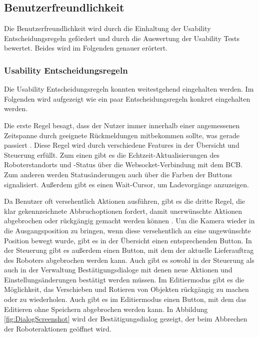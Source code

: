 \subsection{Benutzerfreundlichkeit}
Die Benutzerfreundlichkeit wird durch die Einhaltung der Usability Entscheidungsregeln gefördert und durch die Auswertung der Usability Tests bewertet. Beides wird im Folgenden genauer erörtert.

\subsubsection{Usability Entscheidungsregeln}\label{sec:UsabilityHeuristics}
Die Usability Entscheidungsregeln konnten weitestgehend eingehalten werden. Im Folgenden wird aufgezeigt wie ein paar Entscheidungsregeln konkret eingehalten werden.

Die erste Regel besagt, dass der Nutzer immer innerhalb einer angemessenen Zeitspanne durch geeignete Rückmeldungen mitbekommen sollte, was gerade passiert \cite[Regel 1]{Nielsen.1994}. Diese Regel wird durch verschiedene Features in der Übersicht und Steuerung erfüllt. Zum einen gibt es die Echtzeit-Aktualisierungen des Roboterstandorts und -Status über die \gls{Websocket}-Verbindung mit dem \ac{BCB}. Zum anderen werden Statusänderungen auch über die Farben der Buttons signalisiert. Außerdem gibt es einen Wait-Cursor, um Ladevorgänge anzuzeigen.


Da Benutzer oft versehentlich Aktionen ausführen, gibt es die dritte Regel, die klar gekennzeichnete Abbruchoptionen fordert, damit unerwünschte Aktionen abgebrochen oder rückgängig gemacht werden können \cite[Regel 3]{Nielsen.1994}. Um die Kamera wieder in die Ausgangsposition zu bringen, wenn diese versehentlich an eine ungewünschte Position bewegt wurde, gibt es in der Übersicht einen entsprechenden Button. In der Steuerung gibt es außerdem einen Button, mit dem der aktuelle Lieferauftrag des Roboters abgebrochen werden kann. Auch gibt es sowohl in der Steuerung als auch in der Verwaltung Bestätigungsdialoge mit denen neue Aktionen und Einstellungsänderungen bestätigt werden müssen. Im Editiermodus gibt es die Möglichkeit, das Verschieben und Rotieren von Objekten rückgängig zu machen oder zu wiederholen. Auch gibt es im Editiermodus einen Button, mit dem das Editieren ohne Speichern abgebrochen werden kann. In Abbildung \ref{fig:DialogScreenshot} wird der Bestätigungsdialog gezeigt, der beim Abbrechen der Roboteraktionen geöffnet wird.

